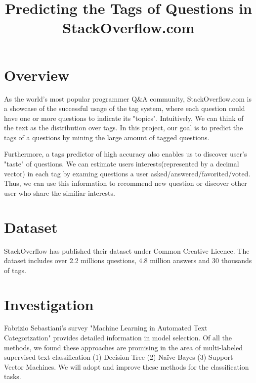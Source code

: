 \documentclass{article} %
\title{Predicting the Tags of Questions in StackOverflow.com}
\begin{document}
\maketitle
\section{Overview}
As the world's most popular programmer Q\&A community, StackOverflow.com  is a showcase of the successful usage of the tag system, where each question could have one or more questions to indicate its "topics". Intuitively, We can think of the text as the distribution over tags.
 In this project, our goal is to predict the tags of a questions by mining the large amount of tagged questions.  

Furthermore, a tags predictor of high accuracy also enables us to discover user's "taste" of questions. We can estimate users interests(represented by a decimal vector) in each tag by examing questions a user asked/answered/favorited/voted. Thus, we can use this information to recommend new question or discover other user who share the similiar interests.

\section{Dataset}
StackOverflow has published their dataset under Common Creative Licence. The dataset includes over 2.2 millions questions, 4.8 million answers and 30 thousands of tags.

\section{Investigation}
Fabrizio Sebastiani's survey "Machine Learning in Automated Text Categorization" provides detailed information in model selection. Of all the methods,  we found these approaches are promising in the area of multi-labeled supervised text classification (1) Decision Tree (2) Naïve Bayes (3) Support Vector Machines. We will adopt and improve these methods for the classification tasks.
\end{document}
